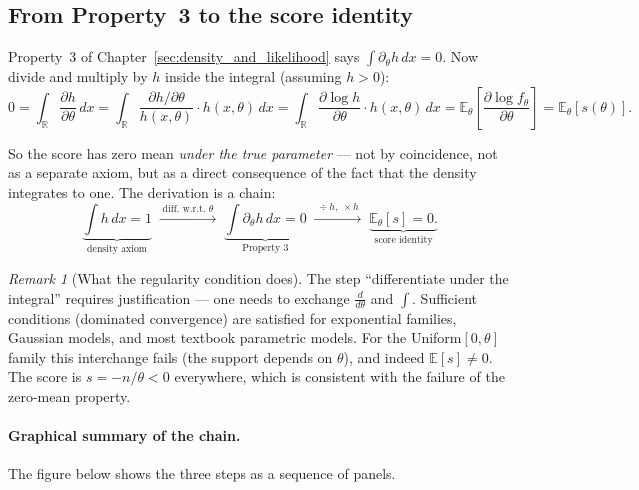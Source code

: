 \documentclass[a4paper,oneside,12pt]{extarticle}
\theoremstyle{plain}
\theoremstyle{definition}
\theoremstyle{remark}
\newtheorem{remark}[proposition]{Remark}
\newcommand*{\E}{\mathbb{E}}
\begin{document}
\subsection{From Property~3 to the score identity}
\label{sec:score_identity_derivation}

Property~3 of Chapter~\ref{sec:density_and_likelihood} says
$\int \partial_\theta h\,dx = 0$.  Now divide and multiply by $h$
inside the integral (assuming $h>0$):
\[
  0 = \int_{\mathbb{R}} \frac{\partial h}{\partial\theta}\,dx
  = \int_{\mathbb{R}} \frac{\partial h/\partial\theta}{h(x,\theta)}\cdot h(x,\theta)\,dx
  = \int_{\mathbb{R}} \frac{\partial \log h}{\partial\theta}\cdot h(x,\theta)\,dx
  = \E_\theta\!\left[\frac{\partial \log f_\theta}{\partial\theta}\right]
  = \E_\theta[s(\theta)].
\]

So the score has zero mean \emph{under the true parameter} --- not by
coincidence, not as a separate axiom, but as a direct consequence of
the fact that the density integrates to one.  The derivation is a
chain:
\[
  \underbrace{\int h\,dx = 1}_{\text{density axiom}}
  \;\xrightarrow{\;\text{diff.\ w.r.t.\ }\theta\;}\;
  \underbrace{\int \partial_\theta h\,dx = 0}_{\text{Property 3}}
  \;\xrightarrow{\;\div h,\;\times h\;}\;
  \underbrace{\E_\theta[s] = 0.}_{\text{score identity}}
\]

\begin{remark}[What the regularity condition does]
The step ``differentiate under the integral'' requires justification
--- one needs to exchange $\frac{d}{d\theta}$ and $\int$.  Sufficient
conditions (dominated convergence) are satisfied for exponential
families, Gaussian models, and most textbook parametric models.  For
the Uniform$[0,\theta]$ family this interchange fails (the support
depends on $\theta$), and indeed $\E[s]\neq 0$.  The score is
$s=-n/\theta<0$ everywhere, which is consistent with the failure of
the zero-mean property.
\end{remark}

\paragraph{Graphical summary of the chain.}
The figure below shows the three steps as a sequence of panels.
\end{document}
